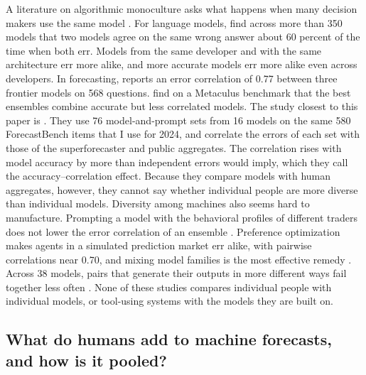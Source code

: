 \documentclass[11pt,a4paper]{article}
\theoremstyle{definition}
\begin{document}
A literature on algorithmic monoculture asks what happens when many decision makers use the same model \citep{kleinberg2021algorithmic,bommasani2022picking}. For language models, \citet{kim2025correlated} find across more than 350 models that two models agree on the same wrong answer about 60 percent of the time when both err. Models from the same developer and with the same architecture err more alike, and more accurate models err more alike even across developers. In forecasting, \citet{spiro2026oracle} reports an error correlation of 0.77 between three frontier models on 568 questions. \citet{aitchison2026diversity} find on a Metaculus benchmark that the best ensembles combine accurate but less correlated models. The study closest to this paper is \citet{jeddi2026crowdsourced}. They use 76 model-and-prompt sets from 16 models on the same 580 ForecastBench items that I use for 2024, and correlate the errors of each set with those of the superforecaster and public aggregates. The correlation rises with model accuracy by more than independent errors would imply, which they call the accuracy--correlation effect. Because they compare models with human aggregates, however, they cannot say whether individual people are more diverse than individual models. Diversity among machines also seems hard to manufacture. Prompting a model with the behavioral profiles of different traders does not lower the error correlation of an ensemble \citep{qian2026nous}. Preference optimization makes agents in a simulated prediction market err alike, with pairwise correlations near 0.70, and mixing model families is the most effective remedy \citep{begin2026preference}. Across 38 models, pairs that generate their outputs in more different ways fail together less often \citep{tieman2026inferred}. None of these studies compares individual people with individual models, or tool-using systems with the models they are built on.

\subsection{What do humans add to machine forecasts, and how is it pooled?}
\end{document}
